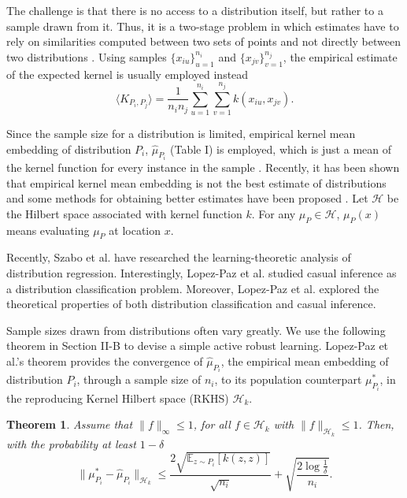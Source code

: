 \documentclass[10pt,twocolumn]{IEEEtran}
\newtheorem{theorem}{Theorem}
\begin{document}
	The challenge is that there is no access to a distribution itself, but rather to a sample drawn from it. Thus, it is a two-stage problem in which estimates have to rely on similarities computed between two sets of points and not directly between two distributions \cite{szabo2016learning}. Using samples $\{x_{iu}\}_{u=1}^{n_i}$ and $\{x_{jv}\}_{v=1}^{n_j}$, the empirical estimate of the expected kernel is usually employed instead
	\begin{equation}
		\langle K_{P_i, P_j} \rangle = \frac{1}{n_i n_j} \sum_{u=1}^{n_i} \sum_{v=1}^{n_j} k(x_{iu}, x_{jv}).
	\end{equation}
	
	Since the sample size for a distribution is limited, empirical kernel mean embedding of distribution $P_i$, $\hat{\mu}_{P_i}$ (Table I) is employed, which is just a mean of the kernel function for every instance in the sample \cite{muandet2017kernel}. Recently, it has been shown that empirical kernel mean embedding is not the best estimate of distributions and some methods for obtaining better estimates have been proposed \cite{muandet2016kernel, flaxman2016bayesian}. Let $\mathcal{H}$ be the Hilbert space associated with kernel function $k$. For any $\mu_P \in \mathcal{H}$, $\mu_P(x)$ means evaluating $\mu_P$ at location $x$.
	
	Recently, Szabo et al. \cite{szabo2016learning} have researched the learning-theoretic analysis of distribution regression. Interestingly, Lopez-Paz et al. \cite{lopez2015towards} studied casual inference as a distribution classification problem. Moreover, Lopez-Paz et al. \cite{lopez2015towards} explored the theoretical properties of both distribution classification and casual inference.
	
	Sample sizes drawn from distributions often vary greatly. We use the following theorem in Section II-B to devise a simple active robust learning. Lopez-Paz et al.'s \cite{lopez2015towards} theorem provides the convergence of $\hat{\mu}_{P_i}$, the empirical mean embedding of distribution $P_i$, through a sample size of $n_i$, to its population counterpart $\mu^*_{P_i}$, in the reproducing Kernel Hilbert space (RKHS) $\mathcal{H}_k$.
	
	\begin{theorem} \label{thm:empirical-convergence}
		Assume that $\|f\|_\infty \le 1$, for all $f \in \mathcal{H}_k$ with $\|f\|_{\mathcal{H}_k} \le 1$. Then, with the probability at least $1 - \delta$
		\begin{equation}
			\|\mu^*_{P_i} - \hat{\mu}_{P_i}\|_{\mathcal{H}_k} \le \frac{2\sqrt{\mathbb{E}_{z \sim P_i}[k(z, z)]}}{\sqrt{n_i}} + \sqrt{\frac{2 \log \frac{1}{\delta}}{n_i}}.
		\end{equation}
	\end{theorem}
	
\end{document}

